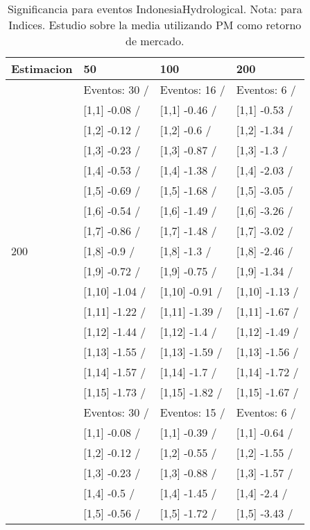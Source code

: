 \begin{table}

\caption{Significancia para eventos IndonesiaHydrological. Nota: para Indices. Estudio sobre la media utilizando PM como retorno de mercado.}
\centering
\begin{tabular}[t]{llll}
\toprule
Estimacion & 50 & 100 & 200\\
\midrule
 & Eventos:  30 / & Eventos:  16 / & Eventos:  6 /\\
 & {}[1,1] -0.08  / & {}[1,1] -0.46  / & {}[1,1] -0.53  /\\
 & {}[1,2] -0.12  / & {}[1,2] -0.6  / & {}[1,2] -1.34  /\\
 & {}[1,3] -0.23  / & {}[1,3] -0.87  / & {}[1,3] -1.3  /\\
 & {}[1,4] -0.53  / & {}[1,4] -1.38  / & {}[1,4] -2.03  /\\
\addlinespace
 & {}[1,5] -0.69  / & {}[1,5] -1.68  / & {}[1,5] -3.05  /\\
 & {}[1,6] -0.54  / & {}[1,6] -1.49  / & {}[1,6] -3.26  /\\
 & {}[1,7] -0.86  / & {}[1,7] -1.48  / & {}[1,7] -3.02  /\\
200 & {}[1,8] -0.9  / & {}[1,8] -1.3  / & {}[1,8] -2.46  /\\
 & {}[1,9] -0.72  / & {}[1,9] -0.75  / & {}[1,9] -1.34  /\\
\addlinespace
 & {}[1,10] -1.04  / & {}[1,10] -0.91  / & {}[1,10] -1.13  /\\
 & {}[1,11] -1.22  / & {}[1,11] -1.39  / & {}[1,11] -1.67  /\\
 & {}[1,12] -1.44  / & {}[1,12] -1.4  / & {}[1,12] -1.49  /\\
 & {}[1,13] -1.55  / & {}[1,13] -1.59  / & {}[1,13] -1.56  /\\
 & {}[1,14] -1.57  / & {}[1,14] -1.7  / & {}[1,14] -1.72  /\\
\addlinespace
 & {}[1,15] -1.73  / & {}[1,15] -1.82  / & {}[1,15] -1.67  /\\
 & Eventos:  30 / & Eventos:  15 / & Eventos:  6 /\\
 & {}[1,1] -0.08  / & {}[1,1] -0.39  / & {}[1,1] -0.64  /\\
 & {}[1,2] -0.12  / & {}[1,2] -0.55  / & {}[1,2] -1.55  /\\
 & {}[1,3] -0.23  / & {}[1,3] -0.88  / & {}[1,3] -1.57  /\\
\addlinespace
 & {}[1,4] -0.5  / & {}[1,4] -1.45  / & {}[1,4] -2.4  /\\
 & {}[1,5] -0.56  / & {}[1,5] -1.72  / & {}[1,5] -3.43  /\\

\end{tabular}
\end{table}
